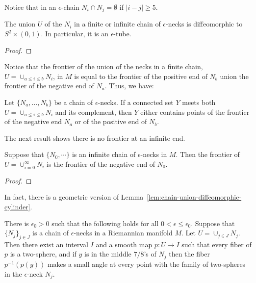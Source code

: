 Notice that in an $\epsilon$-chain $N_i\cap N_j=\emptyset$ if
$|i-j|\ge 5$.


\begin{lemma}
\label{lem:chain-union-diffeomorphic-cylinder}
\label{S2timesI}
The union $U$ of the $N_i$ in a finite or infinite chain of
$\epsilon$-necks is diffeomorphic to $S^2\times (0,1)$. In
particular, it is an $\epsilon$-tube.
\end{lemma}

\begin{proof}
\sketch
{}
\end{proof}

Notice that the frontier of the union of the necks in a finite
chain, $U=\cup_{a\le i\le b}N_i$, in $M$ is equal to the frontier of
the positive end of $N_b$ union the frontier of the negative end of
$N_a$. Thus, we have:

\begin{corollary}
\label{cor:chain-frontier}
\label{chainfrontier}
Let $\{N_a,\ldots,N_b\}$ be a chain of $\epsilon$-necks. If a
connected set $Y$ meets both $U=\cup_{a\le i\le b}N_i$ and its
complement, then $Y$ either contains  points of the frontier of the
negative end $N_a$ or of the positive  end of $N_b$.
\end{corollary}


The next result shows there is no frontier at an infinite end.

\begin{lemma}
\label{lem:infinite-chain-frontier}
\label{inffrontier}
Suppose that $\{N_0,\cdots\}$ is an infinite chain of
$\epsilon$-necks in $M$. Then the frontier of $U=\cup_{i=0}^\infty
N_i$ is the frontier of the negative end of $N_0$.
\end{lemma}

\begin{proof}
\sketch
{}
\end{proof}


 In fact, there is a geometric version of Lemma~\ref{lem:chain-union-diffeomorphic-cylinder}.

\begin{lemma}
\label{lem:chain-fibration-by-spheres}
There is $\epsilon_0>0$ such that  the following holds for all
$0<\epsilon\le \epsilon_0$. Suppose that $\{N_j\}_{j\in J}$ is a
chain of $\epsilon$-necks in a Riemannian manifold $M$. Let
$U=\cup_{j\in J}N_j$. Then there exist an interval $I$ and a smooth
map $p\colon U\to I$ such that every fiber of $p$ is a two-sphere,
and if $y$ is in the middle $7/8$'s of $N_j$ then the fiber
$p^{-1}(p(y))$ makes a small angle at every point with the family of
two-spheres in the $\epsilon$-neck $N_j$.
\end{lemma}



